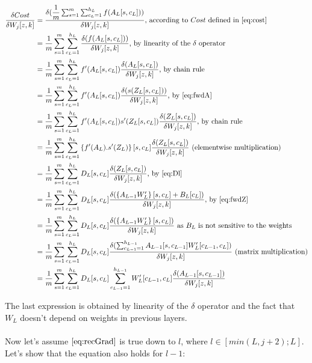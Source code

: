 \documentclass[]{article}
\begin{document}
\begin{align*}
\dfrac{\delta Cost}{\delta W_{j}[z,k]}&=\dfrac{\delta (\dfrac{1}{m}\sum_{s=1}^{m}\sum_{c_L=1}^{h_L}f(A_L[s,c_L]))}{\delta W_{j}[z,k]} \text{, according to $Cost$ defined in $\eqref{eq:cost}$}\\
&=\dfrac{1}{m}\sum_{s=1}^{m}\sum_{c_L=1}^{h_L}\dfrac{\delta (f(A_L[s,c_L]))}{\delta W_{j}[z,k]} \text{, by linearity of the $\delta$ operator}\\
&=\dfrac{1}{m}\sum_{s=1}^{m}\sum_{c_L=1}^{h_L}f'(A_L[s,c_L])\dfrac{\delta (A_L[s,c_L])}{\delta W_{j}[z,k]} \text{, by chain rule}\\
&=\dfrac{1}{m}\sum_{s=1}^{m}\sum_{c_L=1}^{h_L}f'(A_L[s,c_L])\dfrac{\delta (s(Z_L[s,c_L]))}{\delta W_{j}[z,k]} \text{, by $\eqref{eq:fwdA}$}\\
&=\dfrac{1}{m}\sum_{s=1}^{m}\sum_{c_L=1}^{h_L}f'(A_L[s,c_L]) s'(Z_L[s,c_L])\dfrac{\delta (Z_L[s,c_L])}{\delta W_{j}[z,k]} \text{, by chain rule}\\
&=\dfrac{1}{m}\sum_{s=1}^{m}\sum_{c_L=1}^{h_L} \left\lbrace f'(A_L) .  s'(Z_L)\right\rbrace [s,c_L]\dfrac{\delta (Z_L[s,c_L])}{\delta W_{j}[z,k]} \text{ (elementwise multiplication)} \\
&=\dfrac{1}{m}\sum_{s=1}^{m}\sum_{c_L=1}^{h_L} D_L [s,c_L]\dfrac{\delta (Z_L[s,c_L])}{\delta W_{j}[z,k]}  \text{, by $\eqref{eq:Dl}$}\\
&=\dfrac{1}{m}\sum_{s=1}^{m}\sum_{c_L=1}^{h_L} D_L [s,c_L]\dfrac{\delta (\left\lbrace A_{L-1}W_{L}'\right\rbrace [s,c_L]+B_{L}[c_L] )}{\delta W_{j}[z,k]} \text{, by $\eqref{eq:fwdZ}$}\\
&=\dfrac{1}{m}\sum_{s=1}^{m}\sum_{c_L=1}^{h_L} D_L [s,c_L]\dfrac{\delta (\left\lbrace A_{L-1}W_{L}'\right\rbrace [s,c_L] )}{\delta W_{j}[z,k]} \text{ as $B_L$ is not sensitive to the weights}\\
&=\dfrac{1}{m}\sum_{s=1}^{m}\sum_{c_L=1}^{h_L}  D_L [s,c_L]\dfrac{\delta (\sum_{c_{L-1}=1}^{h_{L-1}} A_{L-1}[s,c_{L-1}]W_{L}' [c_{L-1},c_L] )}{\delta W_{j}[z,k]} \text{ (matrix multiplication)}\\
&=\dfrac{1}{m}\sum_{s=1}^{m}\sum_{c_L=1}^{h_L} D_L [s,c_L] \sum_{c_{L-1}=1}^{h_{L-1}}W_{L}' [c_{L-1},c_L] \dfrac{\delta ( A_{L-1}[s,c_{L-1}] )}{\delta W_{j}[z,k] } 
\end{align*}

The last expression is obtained by linearity of the $\delta$ operator and the fact that $W_L$ doesn't depend on weights in previous layers.\\
\\
Now let's assume $\eqref{eq:recGrad}$  is true down to $l$, where $l \in [min(L,j+2);L]$. \\
Let's show that the equation also holds for $l-1$:\\
\end{document}
